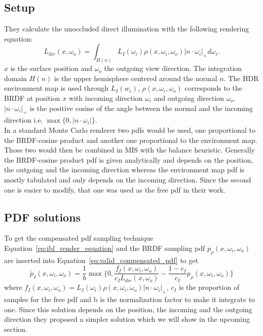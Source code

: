 \subsection{Setup}
\label{sec:ibl_setup}
They calculate the unoccluded direct illumination with the following rendering equation:
\begin{equation}
    \label{eq:ibl_render_equation}
    L_{dir}(x, \omega_o) = \int_{H(n)} L_I(\omega_i) \rho(x, \omega_i, \omega_o) |n \cdot \omega_i|_+ d\omega_i.
\end{equation}
$ x $ is the surface position and $ \omega_o $ the outgoing view direction.
The integration domain $ H(n) $ is the upper hemisphere centered around the normal $ n $.
The HDR environment map is used through $ L_I(w_i) $,
$ \rho(x, \omega_i, \omega_o) $ corresponds to the BRDF at position $ x $
with incoming direction $ \omega_i $ and outgoing direction $ \omega_o $.
$ |n \cdot \omega_i|_+ $ is the positive cosine of the angle between the normal and the incoming direction i.e. $ \max\{0, |n \cdot \omega_i|\} $.\\
In a standard Monte Carlo renderer two pdfs would be used,
one proportional to the BRDF-cosine product and another one proportional to the environment map.
Those two would then be combined in MIS with the balance heuristic.
Generally the BRDF-cosine product pdf is given analytically and depends on the position, the outgoing and the incoming direction
whereas the environment map pdf is mostly tabulated and only depends on the incoming direction.
Since the second one is easier to modify,
that one was used as the free pdf in their work.


\subsection{PDF solutions}
\label{sec:ibl_pdfs}
To get the compensated pdf sampling technique Equation~\ref{eq:ibl_render_equation}
and the BRDF sampling pdf $ p_{\rho}(x, \omega_i, \omega_o) $ are inserted into Equation~\ref{eq:valid_compensated_pdf}
to get $$ \tilde{p}_I(x, \omega_i, \omega_o) = \frac{1}{b} \max\{0, \frac{f_I(x, \omega_i, \omega_o)}{c_I L_{dir}(x, \omega_o)} - \frac{1 - c_I}{c_I} p_\rho(x, \omega_i, \omega_o)\} $$
where $ f_I(x, \omega_i, \omega_o) = L_I(\omega_i) \rho(x, \omega_i, \omega_o) |n \cdot \omega_i|_+ $,
$ c_I $ is the proportion of samples for the free pdf and b is the normalization factor to make it integrate to one.
Since this solution depends on the position, the incoming and the outgoing direction they proposed a simpler solution which we will show in the upcoming section.


